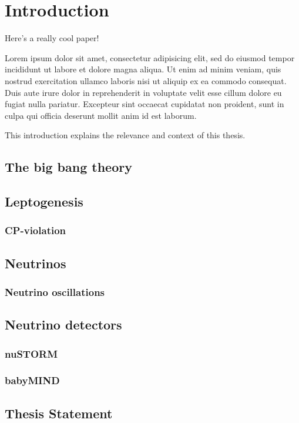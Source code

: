 \chapter{Introduction}
\label{c:intro}


Here's a really cool paper!~\cite{strowes:2011:reallycool}

Lorem ipsum dolor sit amet, consectetur adipisicing elit, sed do
eiusmod tempor incididunt ut labore et dolore magna aliqua. Ut enim ad
minim veniam, quis nostrud exercitation ullamco laboris nisi ut
aliquip ex ea commodo consequat. Duis aute irure dolor in
reprehenderit in voluptate velit esse cillum dolore eu fugiat nulla
pariatur. Excepteur sint occaecat cupidatat non proident, sunt in
culpa qui officia deserunt mollit anim id est laborum.

This introduction explains the relevance and context of this thesis.

\section{The big bang theory}

\section{Leptogenesis}

\subsection{CP-violation}

\section{Neutrinos}

\subsection{Neutrino oscillations}

\section{Neutrino detectors}

\subsection{nuSTORM}

\subsection{babyMIND}

\section{Thesis Statement}
\label{c:intro:thesisstatement}


